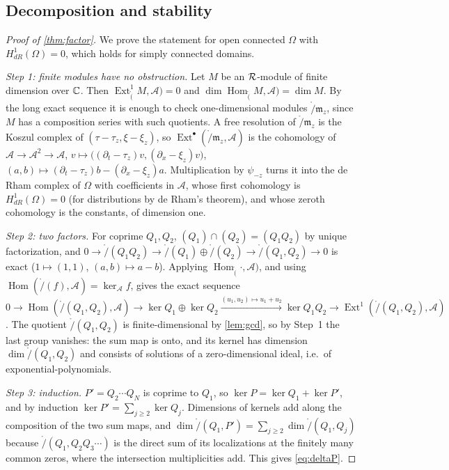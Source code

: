 \subsection{Decomposition and stability}
\begin{proof}[Proof of \cref{thm:factor}]
We prove the statement for open connected $\Omega$ with $H^1_{dR}(\Omega)=0$, which holds for simply connected domains.

\emph{Step 1: finite modules have no obstruction.} Let $M$ be an $\mathcal{R}$-module of finite dimension over $\mathbb{C}$. Then
$\operatorname{Ext}^1_\ring(M,\mathcal A)=0$ and $\dim\operatorname{Hom}_\ring(M,\mathcal A)=\dim M$. By the long exact sequence it is
enough to check one-dimensional modules $\ring/\mathfrak m_z$, since $M$ has a composition series with such
quotients. A free resolution of $\ring/\mathfrak m_z$ is the Koszul complex of $(\tau-\tau_z,\xi-\xi_z)$, so
$\operatorname{Ext}^\bullet(\ring/\mathfrak m_z,\mathcal A)$ is the cohomology of
$\mathcal A\to\mathcal A^2\to\mathcal A$, $v\mapsto\big((\partial_t-\tau_z)v,(\partial_x-\xi_z)v\big)$, $(a,b)\mapsto(\partial_t-\tau_z)b-(\partial_x-\xi_z)a$.
Multiplication by $\psi_{-z}$ turns it into the de Rham complex of $\Omega$ with coefficients in $\mathcal A$, whose first
cohomology is $H^1_{dR}(\Omega)=0$ (for distributions by de Rham's theorem), and whose zeroth cohomology is the constants,
of dimension one.

\emph{Step 2: two factors.} For coprime $Q_1,Q_2$, $(Q_1)\cap(Q_2)=(Q_1Q_2)$ by unique factorization, and
$0\to\ring/(Q_1Q_2)\to\ring/(Q_1)\oplus\ring/(Q_2)\to\ring/(Q_1,Q_2)\to0$ is exact ($1\mapsto(1,1)$, $(a,b)\mapsto a-b$).
Applying $\operatorname{Hom}_\ring(\cdot,\mathcal A)$, and using $\operatorname{Hom}(\ring/(f),\mathcal A)=\ker_{\mathcal A}f$,
gives the exact sequence
$0\to\operatorname{Hom}(\ring/(Q_1,Q_2),\mathcal A)\to\ker Q_1\oplus\ker Q_2\xrightarrow{(u_1,u_2)\mapsto u_1+u_2}\ker Q_1Q_2\to
\operatorname{Ext}^1(\ring/(Q_1,Q_2),\mathcal A)$. The quotient $\ring/(Q_1,Q_2)$ is finite-dimensional by
\cref{lem:gcd}, so by Step~1 the last group vanishes: the sum map is onto, and its kernel has dimension
$\dim\ring/(Q_1,Q_2)$ and consists of solutions of a zero-dimensional ideal, i.e.\ of exponential-polynomials.

\emph{Step 3: induction.} $P'=Q_2\cdots Q_N$ is coprime to $Q_1$, so $\ker P=\ker Q_1+\ker P'$, and by induction
$\ker P'=\sum_{j\ge2}\ker Q_j$. Dimensions of kernels add along the composition of the two sum maps, and
$\dim\ring/(Q_1,P')=\sum_{j\ge2}\dim\ring/(Q_1,Q_j)$ because $\ring/(Q_1,Q_2Q_3\cdots)$ is the direct sum of its
localizations at the finitely many common zeros, where the intersection multiplicities add. This gives
\eqref{eq:deltaP}.
\end{proof}

